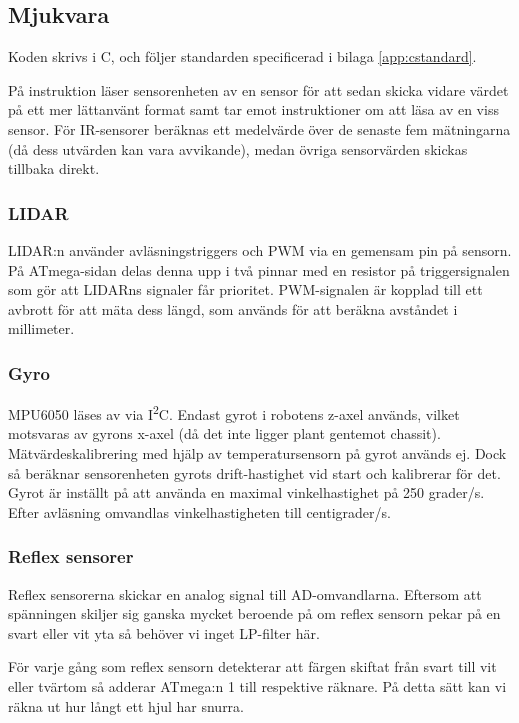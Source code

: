 \documentclass[a4paper,11pt]{article}
\begin{document}
\subsection{Mjukvara}

Koden skrivs i C, och följer standarden specificerad i bilaga \ref{app:cstandard}.

På instruktion läser sensorenheten av en sensor för att sedan skicka vidare värdet på ett mer lättanvänt format samt tar emot instruktioner om att läsa av en viss sensor. För IR-sensorer beräknas ett medelvärde över de senaste fem mätningarna (då dess utvärden kan vara avvikande), medan övriga sensorvärden skickas tillbaka direkt.

\subsubsection{LIDAR}
LIDAR:n använder avläsningstriggers och PWM via en gemensam pin på sensorn. På ATmega-sidan delas denna upp i två pinnar med en resistor på triggersignalen som gör att LIDARns signaler får prioritet. PWM-signalen är kopplad till ett avbrott för att mäta dess längd, som används för att beräkna avståndet i millimeter.

\subsubsection{Gyro}
MPU6050 läses av via I\textsuperscript{2}C. Endast gyrot i robotens z-axel används, vilket motsvaras av gyrons x-axel (då det inte ligger plant gentemot chassit). Mätvärdeskalibrering med hjälp av temperatursensorn på gyrot används ej. Dock så beräknar sensorenheten gyrots drift-hastighet vid start och kalibrerar för det. Gyrot är inställt på att använda en maximal vinkelhastighet på 250 grader/s. Efter avläsning omvandlas vinkelhastigheten till centigrader/s.

\subsubsection{Reflex sensorer}
Reflex sensorerna skickar en analog signal till AD-omvandlarna. Eftersom att spänningen skiljer sig ganska mycket beroende på om reflex sensorn pekar på en svart eller vit yta så behöver vi inget LP-filter här.

För varje gång som reflex sensorn detekterar att färgen skiftat från svart till vit eller tvärtom så adderar ATmega:n 1 till respektive räknare. På detta sätt kan vi räkna ut hur långt ett hjul har snurra.
\end{document}
